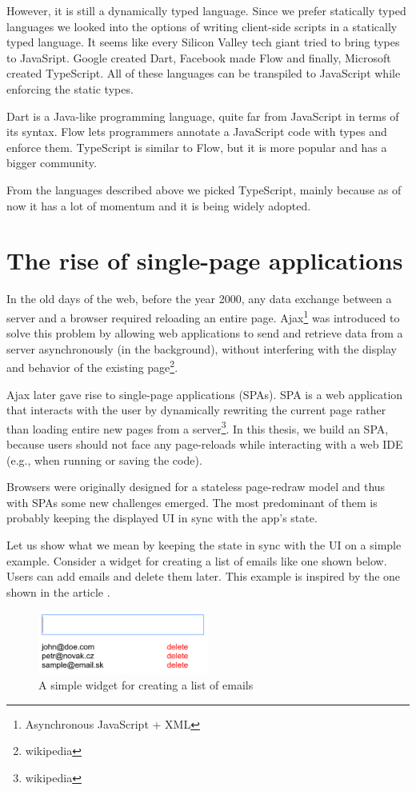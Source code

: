 However, it is still a dynamically typed language. Since we prefer statically typed languages we looked into the options of writing client-side scripts in
a statically typed language. It seems like every Silicon Valley tech giant tried to bring types to JavaSript. Google created Dart,
Facebook made Flow and finally, Microsoft created TypeScript. All of these languages can be transpiled to JavaScript while enforcing the static types.

Dart is a Java-like programming language, quite far from JavaScript in terms of its syntax. Flow lets programmers
annotate a JavaScript code with types and enforce them. TypeScript is similar to Flow, but it is more popular and has a bigger community.

From the languages described above we picked TypeScript, mainly because as of now it has a lot of momentum and it is being widely adopted.

\section{The rise of single-page applications}
In the old days of the web, before the year 2000, any data exchange between a server and a browser required reloading an entire page. 
Ajax\footnote{Asynchronous JavaScript + XML} was introduced to solve this problem by allowing web applications to send and retrieve data from
a server asynchronously (in the background), without interfering with the display and behavior of the existing page\footnote{wikipedia}.

Ajax later gave rise to single-page applications (SPAs). SPA is a web application that interacts with the user by dynamically rewriting
the current page rather than loading entire new pages from a server\footnote{wikipedia}. In this thesis, we build an SPA, because users should not
face any page-reloads while interacting with a web IDE (e.g., when running or saving the code).  

Browsers were originally designed for a stateless page-redraw model and thus with SPAs some new challenges emerged. The most predominant of them is
probably keeping the displayed UI in sync with the app's state.

Let us show what we mean by keeping the state in sync with the UI on a simple example. Consider a widget for creating a list of emails like one shown below.
Users can add emails and delete them later. This example is inspired by the one shown in the article \cite{JSFramework}.
\begin{figure}[!hbt]
    \centering
	\includegraphics[width=0.5\textwidth]{../img/emails}
	\caption{A simple widget for creating a list of emails}
	\label{fig:chap2:emails}
\end{figure}

